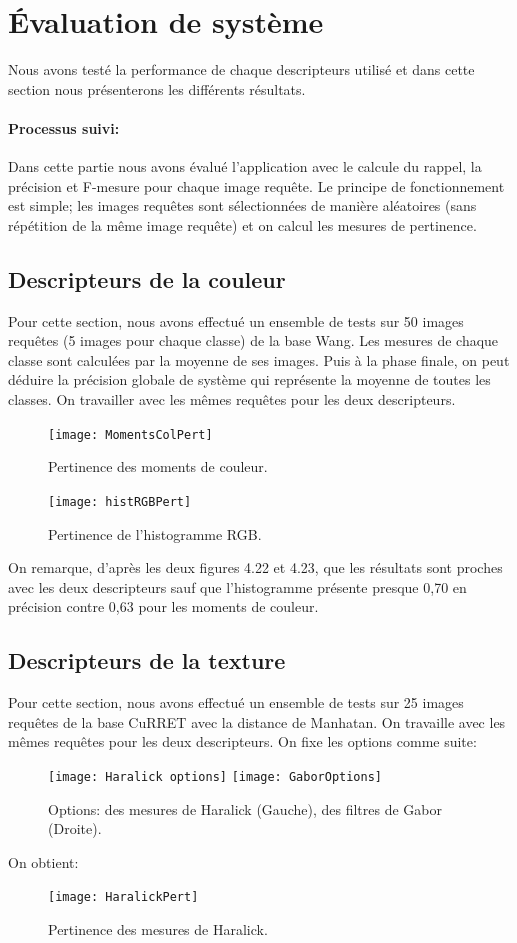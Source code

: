 \section{Évaluation de système}
Nous avons testé la performance de chaque descripteurs utilisé et dans cette section nous présenterons les différents résultats.

\paragraph{Processus suivi:}
Dans cette partie nous avons évalué l’application avec le calcule du rappel, la précision et F-mesure pour chaque image requête. Le principe de fonctionnement est simple; les images requêtes sont sélectionnées de manière aléatoires (sans répétition de la même image requête) et on calcul les mesures de pertinence. 
\subsection{Descripteurs de la couleur}
Pour cette section, nous avons effectué un ensemble de tests sur 50 images requêtes (5 images pour chaque classe) de la base Wang. Les mesures de chaque classe sont calculées par la moyenne de ses images. Puis à la phase finale, on peut déduire la précision globale de système qui représente la moyenne de toutes les classes. On travailler avec les mêmes requêtes pour les deux descripteurs.

\begin{figure}[H]
	\centering
	\texttt{[image: MomentsColPert]} 
	\caption{Pertinence des moments de couleur.}
\end{figure}

\begin{figure}[H]
	\centering
	\texttt{[image: histRGBPert]} 
	\caption{Pertinence de l'histogramme RGB.}
\end{figure}
On remarque, d'après les deux figures 4.22 et 4.23, que les résultats sont proches avec les deux descripteurs sauf que l'histogramme présente presque 0,70 en précision contre 0,63 pour les moments de couleur.
\subsection{Descripteurs de la texture}
Pour cette section, nous avons effectué un ensemble de tests sur 25 images requêtes de la base CuRRET avec la distance de Manhatan. On travaille avec les mêmes requêtes pour les deux descripteurs. 
On fixe les options comme suite:
\begin{figure}[H]
	\centering
	\texttt{[image: Haralick options]} \space
	\texttt{[image: GaborOptions]} 
	\caption{Options: des mesures de Haralick (Gauche),  des filtres de Gabor (Droite).}
\end{figure}
On obtient:
\begin{figure}[H]
	\centering
	\texttt{[image: HaralickPert]} 
	\caption{Pertinence des mesures de Haralick.}
\end{figure}



